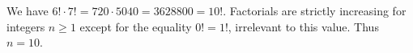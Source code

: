 We have $6!\cdot 7!=720\cdot 5040=3628800=10!$. Factorials are strictly increasing for integers $n\ge 1$ except for the equality $0!=1!$, irrelevant to this value. Thus $\boxed{n=10}$.
